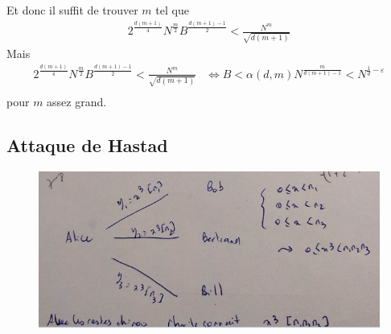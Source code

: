             Et donc il suffit de trouver $m$ tel que
            \begin{align*}
                2^{\frac{d(m + 1)}4} N^{\frac m2} B^{\frac{d(m + 1) - 1}2} < \frac{N^m}{\sqrt{d(m + 1)}}
            \end{align*}
            Mais
            \begin{align*}
                2^{\frac{d(m + 1)}4} N^{\frac m2} B^{\frac{d(m + 1) - 1}2} < \frac{N^m}{\sqrt{d(m + 1)}} &\iff B < \alpha(d, m) N^{\frac m{d(m + 1) - 1}}  < N^{\frac 1d - \varepsilon} \\
            \end{align*}
            pour $m$ assez grand. 

        \subsection{Attaque de Hastad}
            \begin{figure}[H]
                \centering
                \includegraphics[width=.7\textwidth]{08}
            \end{figure} \noindent

